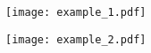 \documentclass{beamer}
\begin{document}



\hspace{-3.3em}
\begin{frame}
  \vspace{-0.3em}
  \texttt{[image: example\_1.pdf]}
\end{frame}


\hspace{-3.3em}
\begin{frame}
  \vspace{-0.3em}
  \texttt{[image: example\_2.pdf]}

  \addtocounter{framenumber}{-1}
\end{frame}









\end{document}
